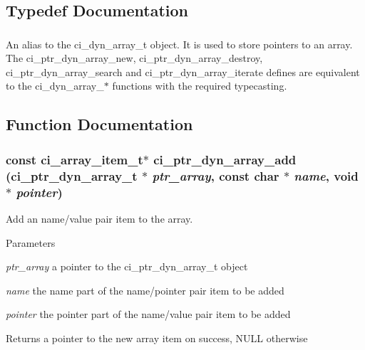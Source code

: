 \subsection{Typedef Documentation}
\hypertarget{group__PTR__DYNAMIC__ARRAYS_gaacb64c1838c9487e46698b597537f130}{
\subsubsection[{ci\_\-ptr\_\-dyn\_\-array\_\-t}]{}}
\label{group__PTR__DYNAMIC__ARRAYS_gaacb64c1838c9487e46698b597537f130}


An alias to the ci\_\-dyn\_\-array\_\-t object. It is used to store pointers to an array. The ci\_\-ptr\_\-dyn\_\-array\_\-new, ci\_\-ptr\_\-dyn\_\-array\_\-destroy, ci\_\-ptr\_\-dyn\_\-array\_\-search and ci\_\-ptr\_\-dyn\_\-array\_\-iterate defines are equivalent to the ci\_\-dyn\_\-array\_\-$\ast$ functions with the required typecasting. 

\subsection{Function Documentation}
\hypertarget{group__PTR__DYNAMIC__ARRAYS_ga857c52c31b06d749bd8809f34976766e}{
\subsubsection[{ci\_\-ptr\_\-dyn\_\-array\_\-add}]{\setlength{\rightskip}{0pt plus 5cm}const ci\_\-array\_\-item\_\-t$\ast$ ci\_\-ptr\_\-dyn\_\-array\_\-add ({\bf ci\_\-ptr\_\-dyn\_\-array\_\-t} $\ast$ {\em ptr\_\-array}, \/  const char $\ast$ {\em name}, \/  void $\ast$ {\em pointer})}}
\label{group__PTR__DYNAMIC__ARRAYS_ga857c52c31b06d749bd8809f34976766e}


Add an name/value pair item to the array. 
\begin{DoxyParams}{Parameters}
\item[{\em ptr\_\-array}]a pointer to the ci\_\-ptr\_\-dyn\_\-array\_\-t object \item[{\em name}]the name part of the name/pointer pair item to be added \item[{\em pointer}]the pointer part of the name/value pair item to be added \end{DoxyParams}
\begin{DoxyReturn}{Returns}
a pointer to the new array item on success, NULL otherwise 
\end{DoxyReturn}

